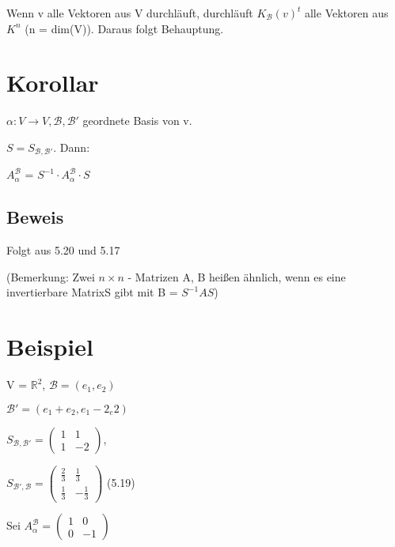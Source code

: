 \documentclass[a4paper, openany]{book}
\begin{document}
        Wenn v alle Vektoren aus V durchläuft, durchläuft $K_{\mathcal{B}}(v)^t$ alle Vektoren aus $K^n$ (n = dim(V)). Daraus folgt Behauptung.

        \section{Korollar}

        $\alpha : V \rightarrow V, \mathcal{B}, \mathcal{B'}$ geordnete Basis von v.

        $S = S_{\mathcal{B, B'}}$. Dann:

        \begin{center}
          $A_{\alpha}^{\mathcal{B}}$ = $S^{-1} \cdot A_{\alpha}^{\mathcal{B}} \cdot S$
        \end{center}

        \subsection{Beweis}

        Folgt aus 5.20 und 5.17

        \par \medskip
        (Bemerkung: Zwei $n \times n$ - Matrizen A, B heißen ähnlich, wenn es eine invertierbare MatrixS gibt mit B = $S^{-1} A S$)

        \section{Beispiel}

        V = $\mathbb{R}^2$, $\mathcal{B} = (e_1, e_2)$

        $\mathcal{B'} = (e_1 + e_2, e_1 - 2_e2)$

        \par \medskip
        \par \medskip

        $S_{\mathcal{B, B'}} = \begin{pmatrix}1 & 1 \\ 1 & -2 \end{pmatrix}$,

        $S_{\mathcal{B', B}} = \begin{pmatrix}\frac{2}{3} & \frac{1}{3} \\ \frac{1}{3} & - \frac{1}{3} \end{pmatrix}$ (5.19)

        Sei $A_{\alpha}^{\mathcal{B}} = \begin{pmatrix}1 & 0 \\ 0 & -1 \end{pmatrix}$
\end{document}
